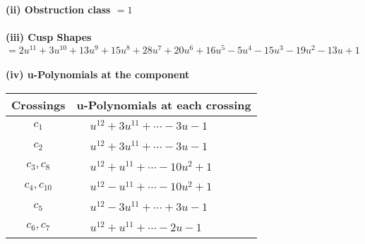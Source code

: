 \documentclass[1p]{elsarticle_modified}
\theoremstyle{definition}
\begin{document}
\flushleft \textbf{(ii) Obstruction class $= 1$}\\~\\
\flushleft \textbf{(iii) Cusp Shapes $= 2 u^{11}+3 u^{10}+13 u^9+15 u^8+28 u^7+20 u^6+16 u^5-5 u^4-15 u^3-19 u^2-13 u+1$}\\~\\
\newpage\renewcommand{\arraystretch}{1}
\flushleft \textbf{(iv) u-Polynomials at the component}\newline \\
\begin{tabular}{m{50pt}|m{274pt}}
Crossings & \hspace{64pt}u-Polynomials at each crossing \\
\hline $$\begin{aligned}c_{1}\end{aligned}$$&$\begin{aligned}
&u^{12}+3 u^{11}+\cdots-3 u-1
\end{aligned}$\\
\hline $$\begin{aligned}c_{2}\end{aligned}$$&$\begin{aligned}
&u^{12}+3 u^{11}+\cdots-3 u-1
\end{aligned}$\\
\hline $$\begin{aligned}c_{3},c_{8}\end{aligned}$$&$\begin{aligned}
&u^{12}+u^{11}+\cdots-10 u^2+1
\end{aligned}$\\
\hline $$\begin{aligned}c_{4},c_{10}\end{aligned}$$&$\begin{aligned}
&u^{12}- u^{11}+\cdots-10 u^2+1
\end{aligned}$\\
\hline $$\begin{aligned}c_{5}\end{aligned}$$&$\begin{aligned}
&u^{12}-3 u^{11}+\cdots+3 u-1
\end{aligned}$\\
\hline $$\begin{aligned}c_{6},c_{7}\end{aligned}$$&$\begin{aligned}
&u^{12}+u^{11}+\cdots-2 u-1
\end{aligned}$\\

\end{tabular}
\end{document}
